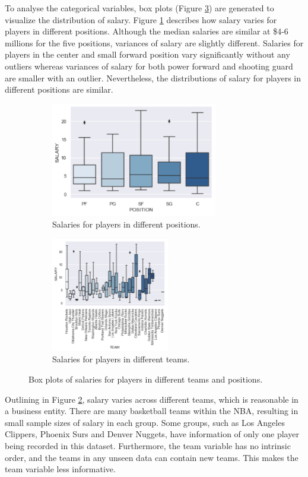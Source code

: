 \documentclass[letterpaper,12pt,twoside,]{pinp}
\begin{document}
To analyse the categorical variables, box plots (Figure \ref{fig:boxes})
are generated to visualize the distribution of salary. Figure
\ref{fig:position} describes how salary varies for players in different
positions. Although the median salaries are similar at \$4-6 millions
for the five positions, variances of salary are slightly different.
Salaries for players in the center and small forward position vary
significantly without any outliers whereas variances of salary for both
power forward and shooting guard are smaller with an outlier.
Nevertheless, the distributions of salary for players in different
positions are similar.

\begin{figure}[H]
\begin{subfigure}{0.5\textwidth}
\includegraphics[width=0.9\linewidth, height=5cm]{position_box.png}
\centering
\caption{Salaries for players in different positions.}
\label{fig:position}
\end{subfigure}
\begin{subfigure}{0.5\textwidth}
\includegraphics[width=0.9\linewidth, height=5cm]{team_box.png}
\centering
\caption{Salaries for players in different teams.}
\label{fig:team}
\end{subfigure}
\caption{Box plots of salaries for players in different teams and positions.}
\label{fig:boxes}
\end{figure}

Outlining in Figure \ref{fig:team}, salary varies across different
teams, which is reasonable in a business entity. There are many
basketball teams within the NBA, resulting in small sample sizes of
salary in each group. Some groups, such as Los Angeles Clippers, Phoenix
Surs and Denver Nuggets, have information of only one player being
recorded in this dataset. Furthermore, the team variable has no
intrinsic order, and the teams in any unseen data can contain new teams.
This makes the team variable less informative.
\end{document}
